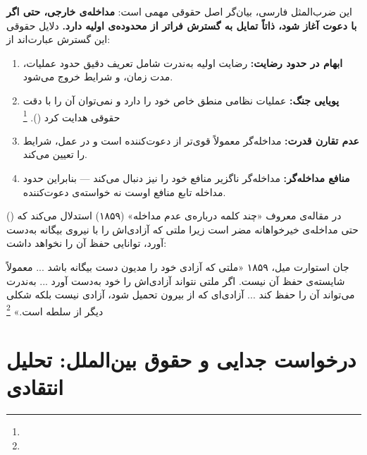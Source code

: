 \begin{tcolorbox}[enemybox, title={«مست گیرند، در شهر هر آنکه هست گیرند» — تحلیل حقوقی}]
این ضرب‌المثل فارسی، بیان‌گر اصل حقوقی مهمی است: \textbf{مداخله‌ی خارجی، حتی اگر با دعوت آغاز شود، ذاتاً تمایل به گسترش فراتر از محدوده‌ی اولیه دارد.} دلایل حقوقی این گسترش عبارت‌اند از:

\begin{enumerate}[nosep, label=\textbf{\arabic*.}]
  \item \textbf{ابهام در حدود رضایت:} رضایت اولیه به‌ندرت شامل تعریف دقیق حدود عملیات، مدت زمان، و شرایط خروج می‌شود.
  \item \textbf{پویایی جنگ:} عملیات نظامی منطق خاص خود را دارد و نمی‌توان آن را با دقت حقوقی هدایت کرد ().%
  \footnote{}
  \item \textbf{عدم تقارن قدرت:} مداخله‌گر معمولاً قوی‌تر از دعوت‌کننده است و در عمل، شرایط را تعیین می‌کند.
  \item \textbf{منافع مداخله‌گر:} مداخله‌گر ناگزیر منافع خود را نیز دنبال می‌کند — بنابراین حدود مداخله تابع منافع اوست نه خواسته‌ی دعوت‌کننده.
\end{enumerate}
\end{tcolorbox}

 () در مقاله‌ی معروف «چند کلمه درباره‌ی عدم مداخله» (۱۸۵۹) استدلال می‌کند که حتی مداخله‌ی خیرخواهانه مضر است زیرا ملتی که آزادی‌اش را با نیروی بیگانه به‌دست آورد، توانایی حفظ آن را نخواهد داشت:

\begin{histQuote}{جان استوارت میل، ۱۸۵۹}
«ملتی که آزادی خود را مدیون دست بیگانه باشد ... معمولاً شایسته‌ی حفظ آن نیست. اگر ملتی نتواند آزادی‌اش را خود به‌دست آورد ... به‌ندرت می‌تواند آن را حفظ کند ... آزادی‌ای که از بیرون تحمیل شود، آزادی نیست بلکه شکلی دیگر از سلطه است.»%
\footnote{}
\end{histQuote}

\section{درخواست جدایی و حقوق بین‌الملل: تحلیل انتقادی}
\label{sec:ch02-secession}

